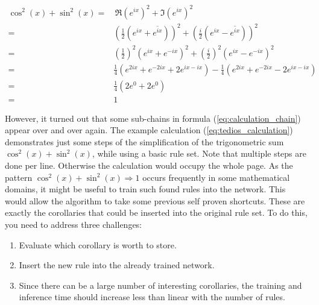 \documentclass{scrartcl}
\theoremstyle{definition}
\begin{document}
\begin{equation}
	\label{eq:tedios_calculation}
	\begin{aligned}
		\cos^2(x)+\sin^2(x) = &\, \Re\left(e^{ix}\right)^2+\Im\left(e^{ix}\right)^2 \\
		= & \left(\frac{1}{2} \left(e^{ix}+\overline{e^{ix}}\right)\right)^2 + \left(\frac{i}{2} \left(e^{ix}-\overline{e^{ix}}\right)\right)^2 \\
		= & \left(\frac{1}{2}\right)^2 \left(e^{ix}+e^{-ix}\right)^2 + \left(\frac{i}{2}\right)^2 \left(e^{ix}-e^{-ix}\right)^2 \\
		= & \frac{1}{4} \left(e^{2ix}+e^{-2ix}+2e^{ix-ix}\right) - \frac{1}{4} \left(e^{2ix}+e^{-2ix}-2e^{ix-ix}\right) \\
		= & \frac{1}{4} \left( 2e^0+2e^0 \right) \\
		= & 1
	\end{aligned}
\end{equation}

However, it turned out that some sub-chains in formula (\ref{eq:calculation_chain}) appear over and over again.
The example calculation (\ref{eq:tedios_calculation}) demonstrates just some steps of the simplification of the trigonometric sum $\cos^2(x)+\sin^2(x)$, while using a basic rule set.
Note that multiple steps are done per line. Otherwise the calculation would occupy the whole page.
As the pattern $\cos^2(x)+\sin^2(x) \Longrightarrow 1$ occurs frequently in some mathematical domains, it might be useful to train such found rules into the network.
This would allow the algorithm to take some previous self proven shortcuts.
These are exactly the corollaries that could be inserted into the original rule set.
To do this, you need to address three challenges:

\begin{enumerate}[label=(\roman*)]
	\item Evaluate which corollary is worth to store.
	\item Insert the new rule into the already trained network.
	\item Since there can be a large number of interesting corollaries, the training and inference time should increase less than linear with the number of rules.
\end{enumerate}
\end{document}
